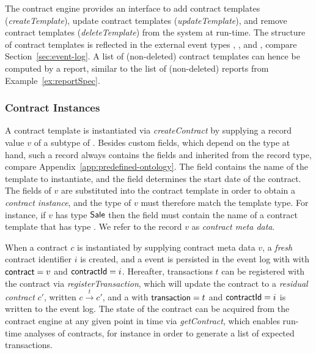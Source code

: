 The contract engine provides an interface to add contract templates
(\emph{createTemplate}), update contract templates
(\emph{updateTemplate}), and remove contract templates
(\emph{deleteTemplate}) from the system at run-time. The structure of
contract templates is reflected in the external event types
, , and
, compare Section~\ref{sec:event-log}. A
list of (non-deleted) contract templates can hence be computed by a
report, similar to the list of (non-deleted) reports from
Example~\ref{ex:reportSpec}.

\subsubsection{Contract Instances}
\label{sec:contract-instances}
A contract template is instantiated via \emph{createContract} by
supplying a record value $v$ of a subtype of
. Besides custom fields, which depend 
on the type at hand, such a record always contains the fields
 and 
inherited from the  record type, compare
Appendix~\ref{app:predefined-ontology}. The field
 contains the name of the template to
instantiate, and the field  determines the start
date of the contract. The fields of $v$ are substituted into the
contract template in order to obtain a \emph{contract instance}, and
the type of $v$ must therefore match the template type. For instance,
if $v$ has type $\mathsf{Sale}$ then the field
 must contain the name of a contract template
that has type . We refer to the record $v$ as
\emph{contract meta data}.

When a contract $c$ is instantiated by supplying contract meta data
$v$, a \emph{fresh} contract identifier $i$ is created, and a
 event is persisted in the event log with
with $\mathsf{contract} = v$ and $\mathsf{contractId} =
i$. Hereafter, 
transactions $t$ can be registered with the contract via
\emph{registerTransaction}, which will
update the contract to a \emph{residual contract} $c'$, written $c
\stackrel{t}{\to} c'$, and a  with
$\mathsf{transaction} = t$ and $\mathsf{contractId} = i$ is
written to the event log. The state of the contract can be acquired
from the contract engine at any given point in time via
\emph{getContract}, which enables run-time analyses of contracts, for
instance in order to generate a list of expected transactions.

